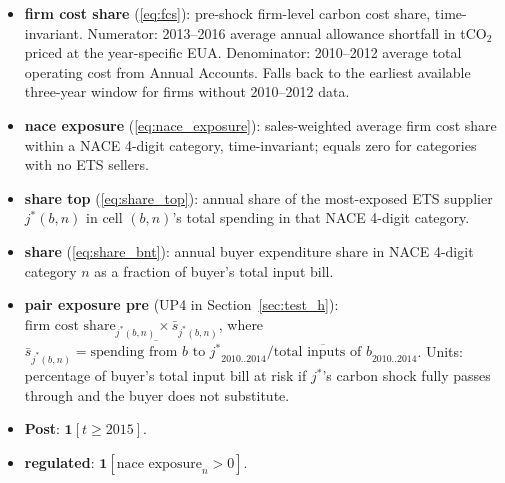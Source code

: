 \begin{itemize}
    \item \textbf{firm cost share} (\eqref{eq:fcs}): pre-shock firm-level carbon cost share, time-invariant. Numerator: 2013--2016 average annual allowance shortfall in tCO$_2$ priced at the year-specific EUA. Denominator: 2010--2012 average total operating cost from Annual Accounts. Falls back to the earliest available three-year window for firms without 2010--2012 data.
    \item \textbf{nace exposure} (\eqref{eq:nace_exposure}): sales-weighted average firm cost share within a NACE 4-digit category, time-invariant; equals zero for categories with no ETS sellers.
    \item \textbf{share top} (\eqref{eq:share_top}): annual share of the most-exposed ETS supplier $j^*(b,n)$ in cell $(b,n)$'s total spending in that NACE 4-digit category.
    \item \textbf{share} (\eqref{eq:share_bnt}): annual buyer expenditure share in NACE 4-digit category $n$ as a fraction of buyer's total input bill.
    \item \textbf{pair exposure pre} (UP4 in Section~\ref{sec:test_h}): $\text{firm cost share}_{j^*(b,n)} \times \bar{s}_{j^*(b,n)}$, where $\bar{s}_{j^*(b,n)} = \overline{\text{spending from } b \text{ to } j^*}_{2010..2014} / \overline{\text{total inputs of } b}_{2010..2014}$. Units: percentage of buyer's total input bill at risk if $j^*$'s carbon shock fully passes through and the buyer does not substitute.
    \item \textbf{Post}: $\mathbf{1}[t \geq 2015]$.
    \item \textbf{regulated}: $\mathbf{1}[\text{nace exposure}_n > 0]$.
\end{itemize}
